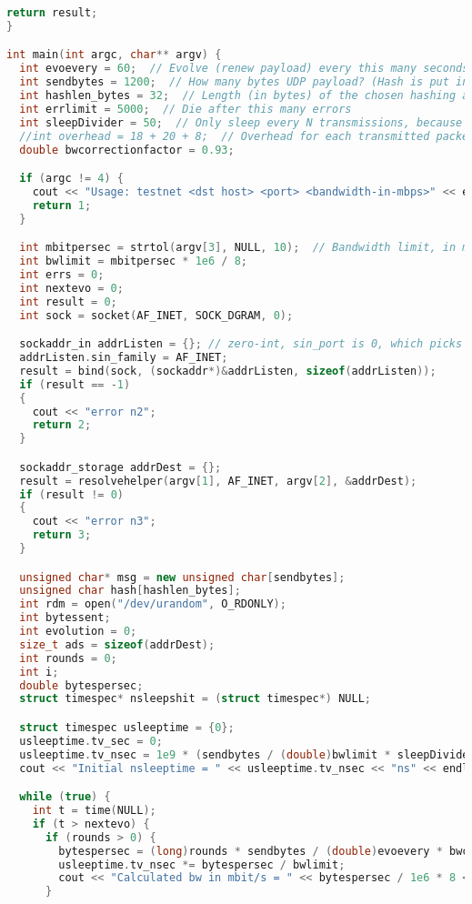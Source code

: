 \begin{appendices}
\begin{lstlisting}[language=C++]
  return result;
}

int main(int argc, char** argv) {
  int evoevery = 60;  // Evolve (renew payload) every this many seconds
  int sendbytes = 1200;  // How many bytes UDP payload? (Hash is put in the last sendbytes-hashlen_bytes bytes.)
  int hashlen_bytes = 32;  // Length (in bytes) of the chosen hashing algorithm
  int errlimit = 5000;  // Die after this many errors
  int sleepDivider = 50;  // Only sleep every N transmissions, because the nanosleep call has an amazing amount of overhead, for something claiming to sleep some 'nanoseconds'...
  //int overhead = 18 + 20 + 8;  // Overhead for each transmitted packet, in bytes (eth,ip,udp)
  double bwcorrectionfactor = 0.93;

  if (argc != 4) {
    cout << "Usage: testnet <dst host> <port> <bandwidth-in-mbps>" << endl;
    return 1;
  }

  int mbitpersec = strtol(argv[3], NULL, 10);  // Bandwidth limit, in megabits. Note that tx rate is only evaluated once per evolution.
  int bwlimit = mbitpersec * 1e6 / 8;
  int errs = 0;
  int nextevo = 0;
  int result = 0;
  int sock = socket(AF_INET, SOCK_DGRAM, 0);

  sockaddr_in addrListen = {}; // zero-int, sin_port is 0, which picks a random port for bind.
  addrListen.sin_family = AF_INET;
  result = bind(sock, (sockaddr*)&addrListen, sizeof(addrListen));
  if (result == -1)
  {
    cout << "error n2";
    return 2;
  }

  sockaddr_storage addrDest = {};
  result = resolvehelper(argv[1], AF_INET, argv[2], &addrDest);
  if (result != 0)
  {
    cout << "error n3";
    return 3;
  }

  unsigned char* msg = new unsigned char[sendbytes];
  unsigned char hash[hashlen_bytes];
  int rdm = open("/dev/urandom", O_RDONLY);
  int bytessent;
  int evolution = 0;
  size_t ads = sizeof(addrDest);
  int rounds = 0;
  int i;
  double bytespersec;
  struct timespec* nsleepshit = (struct timespec*) NULL;

  struct timespec usleeptime = {0};
  usleeptime.tv_sec = 0;
  usleeptime.tv_nsec = 1e9 * (sendbytes / (double)bwlimit * sleepDivider);
  cout << "Initial nsleeptime = " << usleeptime.tv_nsec << "ns" << endl;

  while (true) {
    int t = time(NULL);
    if (t > nextevo) {
      if (rounds > 0) {
        bytespersec = (long)rounds * sendbytes / (double)evoevery * bwcorrectionfactor;
        usleeptime.tv_nsec *= bytespersec / bwlimit;
        cout << "Calculated bw in mbit/s = " << bytespersec / 1e6 * 8 << "; nsleeptime *= " << bytespersec / bwlimit << "; new nsleeptime = " << usleeptime.tv_nsec << endl;
      }


\end{lstlisting}
\end{appendices}
